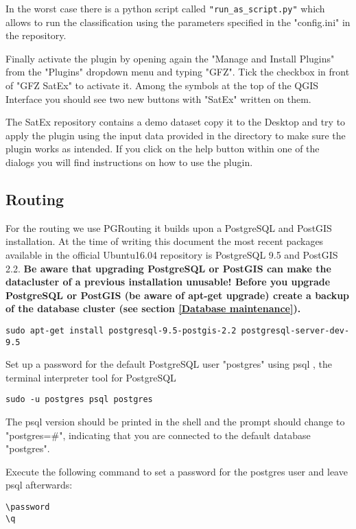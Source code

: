 \documentclass{article}
\begin{document}
In the worst case there is a python script called
\verb|"run_as_script.py"| which allows to run the classification
using the parameters specified in the "config.ini" in the repository.
 
Finally activate the plugin by opening again the "Manage and Install Plugins" from the "Plugins" dropdown menu and typing "GFZ". Tick the
checkbox in front of "GFZ SatEx" to activate it. Among the symbols
at the top of the QGIS Interface you should see two new buttons
with "SatEx" written on them.

The SatEx repository contains a demo dataset copy it to the Desktop
and try to apply the plugin using the input data provided
in the directory to make sure the plugin works as intended. If
you click on the help button within one of
the dialogs you will find instructions on how to use
the plugin.

\subsection{Routing}
For the routing we use PGRouting it builds upon a PostgreSQL and 
PostGIS installation.
 At the time
of writing this document the most recent packages available in
the official Ubuntu16.04 repository is PostgreSQL 9.5 and PostGIS 2.2.
\textbf{Be aware that upgrading PostgreSQL or PostGIS can make the 
datacluster of a previous installation unusable! Before you
upgrade PostgreSQL or PostGIS (be aware of apt-get upgrade) create a backup of the database cluster (see section \ref{Database maintenance}).}

\begin{verbatim}
sudo apt-get install postgresql-9.5-postgis-2.2 postgresql-server-dev-9.5
\end{verbatim}

Set up a password for the default PostgreSQL user "postgres" using psql
, the terminal interpreter tool for PostgreSQL
\begin{verbatim}
sudo -u postgres psql postgres
\end{verbatim}
The psql version should be printed in the shell and the 
prompt should change to "postgres=\#", indicating that you are connected
to the default database "postgres".  

Execute the following command to set a password for the postgres user
and leave psql afterwards:

\begin{verbatim}
\password
\q
\end{verbatim}
\end{document}
